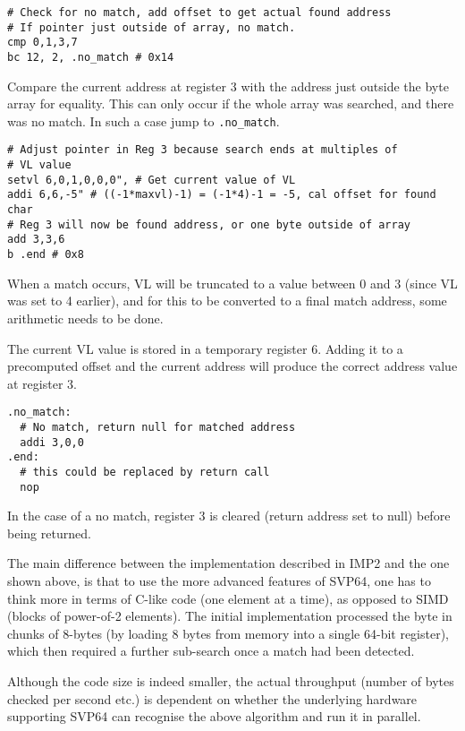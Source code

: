 \begin{verbatim}
# Check for no match, add offset to get actual found address
# If pointer just outside of array, no match.
cmp 0,1,3,7
bc 12, 2, .no_match # 0x14
\end{verbatim}

Compare the current address at register 3 with the address just outside
the byte array for equality. This can only occur if the whole array was
searched, and there was no match. In such a case jump to \texttt{.no\_match}.

\begin{verbatim}
# Adjust pointer in Reg 3 because search ends at multiples of
# VL value
setvl 6,0,1,0,0,0", # Get current value of VL
addi 6,6,-5" # ((-1*maxvl)-1) = (-1*4)-1 = -5, cal offset for found char
# Reg 3 will now be found address, or one byte outside of array
add 3,3,6
b .end # 0x8
\end{verbatim}

When a match occurs, \acrshort{VL} will be truncated to a value between 0 and 3
(since \acrshort{VL} was set to 4 earlier), and for this to be converted to a
final match address, some arithmetic needs to be done.

The current \acrshort{VL} value is stored in a temporary register 6. Adding it to a
precomputed offset and the current address will produce the correct address
value at register 3.

\begin{verbatim}
.no_match:
  # No match, return null for matched address
  addi 3,0,0
.end:
  # this could be replaced by return call
  nop
\end{verbatim}

In the case of a no match, register 3 is cleared (return address set to null)
before being returned.

The main difference between the implementation described in \acrshort{IMP}2
and the one shown above, is that to use the more advanced features of
\acrshort{SVP64}, one has to think more in terms of C-like code (one element at a time),
as opposed to \acrshort{SIMD} (blocks of power-of-2 elements). The initial
implementation processed the byte in chunks of 8-bytes (by loading 8 bytes
from memory into a single 64-bit register), which then required a further
sub-search once a match had been detected.

Although the code size is indeed smaller, the actual throughput (number of
bytes checked per second etc.) is dependent on whether the underlying hardware
supporting \acrshort{SVP64} can recognise the above algorithm and run it in parallel.
